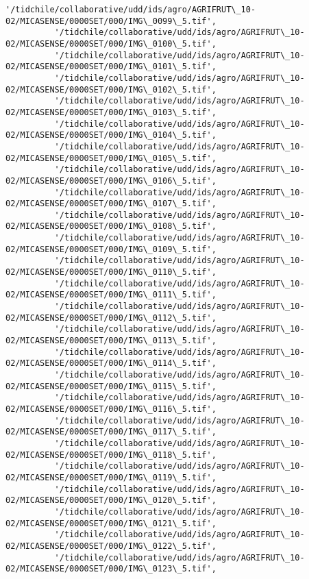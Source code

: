 \documentclass[11pt]{article}
\begin{document}
\begin{Verbatim}[commandchars=\\\{\}]
          '/tidchile/collaborative/udd/ids/agro/AGRIFRUT\_10-02/MICASENSE/0000SET/000/IMG\_0099\_5.tif',
          '/tidchile/collaborative/udd/ids/agro/AGRIFRUT\_10-02/MICASENSE/0000SET/000/IMG\_0100\_5.tif',
          '/tidchile/collaborative/udd/ids/agro/AGRIFRUT\_10-02/MICASENSE/0000SET/000/IMG\_0101\_5.tif',
          '/tidchile/collaborative/udd/ids/agro/AGRIFRUT\_10-02/MICASENSE/0000SET/000/IMG\_0102\_5.tif',
          '/tidchile/collaborative/udd/ids/agro/AGRIFRUT\_10-02/MICASENSE/0000SET/000/IMG\_0103\_5.tif',
          '/tidchile/collaborative/udd/ids/agro/AGRIFRUT\_10-02/MICASENSE/0000SET/000/IMG\_0104\_5.tif',
          '/tidchile/collaborative/udd/ids/agro/AGRIFRUT\_10-02/MICASENSE/0000SET/000/IMG\_0105\_5.tif',
          '/tidchile/collaborative/udd/ids/agro/AGRIFRUT\_10-02/MICASENSE/0000SET/000/IMG\_0106\_5.tif',
          '/tidchile/collaborative/udd/ids/agro/AGRIFRUT\_10-02/MICASENSE/0000SET/000/IMG\_0107\_5.tif',
          '/tidchile/collaborative/udd/ids/agro/AGRIFRUT\_10-02/MICASENSE/0000SET/000/IMG\_0108\_5.tif',
          '/tidchile/collaborative/udd/ids/agro/AGRIFRUT\_10-02/MICASENSE/0000SET/000/IMG\_0109\_5.tif',
          '/tidchile/collaborative/udd/ids/agro/AGRIFRUT\_10-02/MICASENSE/0000SET/000/IMG\_0110\_5.tif',
          '/tidchile/collaborative/udd/ids/agro/AGRIFRUT\_10-02/MICASENSE/0000SET/000/IMG\_0111\_5.tif',
          '/tidchile/collaborative/udd/ids/agro/AGRIFRUT\_10-02/MICASENSE/0000SET/000/IMG\_0112\_5.tif',
          '/tidchile/collaborative/udd/ids/agro/AGRIFRUT\_10-02/MICASENSE/0000SET/000/IMG\_0113\_5.tif',
          '/tidchile/collaborative/udd/ids/agro/AGRIFRUT\_10-02/MICASENSE/0000SET/000/IMG\_0114\_5.tif',
          '/tidchile/collaborative/udd/ids/agro/AGRIFRUT\_10-02/MICASENSE/0000SET/000/IMG\_0115\_5.tif',
          '/tidchile/collaborative/udd/ids/agro/AGRIFRUT\_10-02/MICASENSE/0000SET/000/IMG\_0116\_5.tif',
          '/tidchile/collaborative/udd/ids/agro/AGRIFRUT\_10-02/MICASENSE/0000SET/000/IMG\_0117\_5.tif',
          '/tidchile/collaborative/udd/ids/agro/AGRIFRUT\_10-02/MICASENSE/0000SET/000/IMG\_0118\_5.tif',
          '/tidchile/collaborative/udd/ids/agro/AGRIFRUT\_10-02/MICASENSE/0000SET/000/IMG\_0119\_5.tif',
          '/tidchile/collaborative/udd/ids/agro/AGRIFRUT\_10-02/MICASENSE/0000SET/000/IMG\_0120\_5.tif',
          '/tidchile/collaborative/udd/ids/agro/AGRIFRUT\_10-02/MICASENSE/0000SET/000/IMG\_0121\_5.tif',
          '/tidchile/collaborative/udd/ids/agro/AGRIFRUT\_10-02/MICASENSE/0000SET/000/IMG\_0122\_5.tif',
          '/tidchile/collaborative/udd/ids/agro/AGRIFRUT\_10-02/MICASENSE/0000SET/000/IMG\_0123\_5.tif',

\end{Verbatim}
\end{document}
